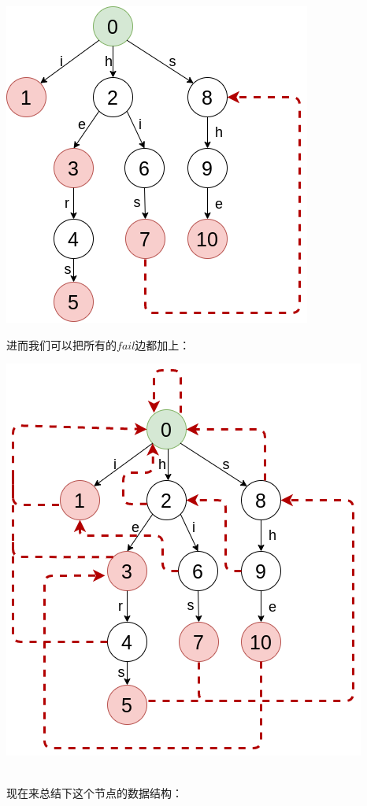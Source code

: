 \documentclass{article}
\begin{document}
\includegraphics[scale=0.35]{pic2.png} \par
进而我们可以把所有的$fail$边都加上：　\par
\includegraphics[scale=0.6]{pic3.png} \par
~\\
现在来总结下这个节点的数据结构：　\par
\end{document}
